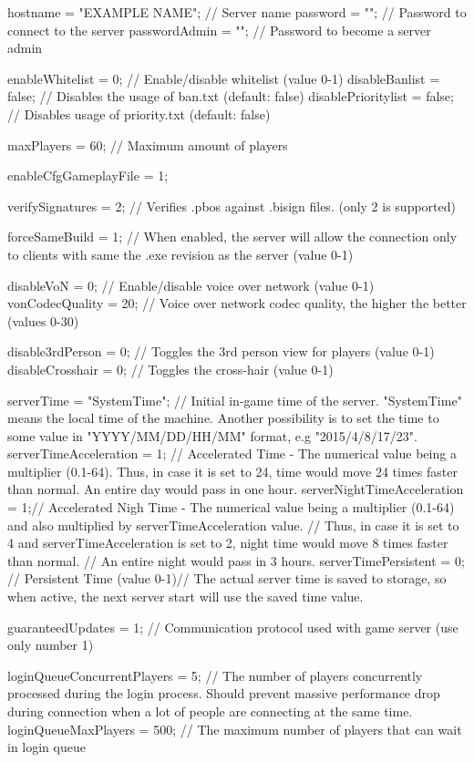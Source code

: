 hostname = "EXAMPLE NAME";	// Server name
password = "";				// Password to connect to the server
passwordAdmin = "";			// Password to become a server admin

enableWhitelist = 0;		// Enable/disable whitelist (value 0-1)
disableBanlist = false;					// Disables the usage of ban.txt (default: false)
disablePrioritylist = false;			// Disables usage of priority.txt (default: false)

maxPlayers = 60;			// Maximum amount of players

enableCfgGameplayFile = 1;

verifySignatures = 2;		// Verifies .pbos against .bisign files. (only 2 is supported)

forceSameBuild = 1;			// When enabled, the server will allow the connection only to clients with same the .exe revision as the server (value 0-1)

disableVoN = 0;				// Enable/disable voice over network (value 0-1)
vonCodecQuality = 20;		// Voice over network codec quality, the higher the better (values 0-30)

disable3rdPerson = 0;		// Toggles the 3rd person view for players (value 0-1)
disableCrosshair = 0;		// Toggles the cross-hair (value 0-1)

serverTime = "SystemTime";	// Initial in-game time of the server. "SystemTime" means the local time of the machine. Another possibility is to set the time to some value in "YYYY/MM/DD/HH/MM" format, e.g "2015/4/8/17/23".
serverTimeAcceleration = 1;	// Accelerated Time - The numerical value being a multiplier (0.1-64). Thus, in case it is set to 24, time would move 24 times faster than normal. An entire day would pass in one hour.
serverNightTimeAcceleration = 1;// Accelerated Nigh Time - The numerical value being a multiplier (0.1-64) and also multiplied by serverTimeAcceleration value.
								// Thus, in case it is set to 4 and serverTimeAcceleration is set to 2, night time would move 8 times faster than normal.
								// An entire night would pass in 3 hours.
serverTimePersistent = 0;	// Persistent Time (value 0-1)// The actual server time is saved to storage, so when active, the next server start will use the saved time value.

guaranteedUpdates = 1;		// Communication protocol used with game server (use only number 1)

loginQueueConcurrentPlayers = 5;	// The number of players concurrently processed during the login process. Should prevent massive performance drop during connection when a lot of people are connecting at the same time.
loginQueueMaxPlayers = 500;			// The maximum number of players that can wait in login queue

